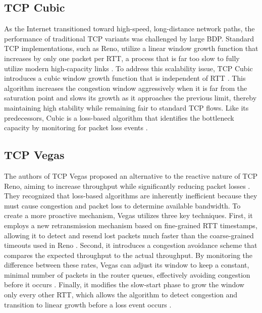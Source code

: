 \subsection{TCP Cubic}

As the Internet transitioned toward high-speed, long-distance network paths, the performance of traditional \ac{TCP} variants was challenged by large \ac{BDP}. 
Standard TCP implementations, such as Reno, utilize a linear window growth function that increases by only one packet per \ac{RTT}, a process that is far too slow to fully utilize modern high-capacity links \cite{TCPCUBIC}. 
To address this scalability issue, TCP Cubic introduces a cubic window growth function that is independent of \ac{RTT} \cite{TCPCUBIC}. 
This algorithm increases the congestion window aggressively when it is far from the saturation point and slows its growth as it approaches the previous limit, thereby maintaining high stability while remaining fair to standard TCP flows. 
Like its predecessors, Cubic is a loss-based algorithm that identifies the bottleneck capacity by monitoring for packet loss events \cite{TCPCUBIC}.

\subsection{TCP Vegas}

The authors of TCP Vegas proposed an alternative to the reactive nature of TCP Reno, aiming to increase throughput while significantly reducing packet losses \cite{TCPVEGAS}. 
They recognized that loss-based algorithms are inherently inefficient because they must cause congestion and packet loss to determine available bandwidth. 
To create a more proactive mechanism, Vegas utilizes three key techniques. 
First, it employs a new retransmission mechanism based on fine-grained \ac{RTT} timestamps, allowing it to detect and resend lost packets much faster than the coarse-grained timeouts used in Reno \cite{TCPVEGAS}. 
Second, it introduces a congestion avoidance scheme that compares the expected throughput to the actual throughput. 
By monitoring the difference between these rates, Vegas can adjust its window to keep a constant, minimal number of packets in the router queues, effectively avoiding congestion before it occurs \cite{TCPVEGAS}. 
Finally, it modifies the slow-start phase to grow the window only every other \ac{RTT}, which allows the algorithm to detect congestion and transition to linear growth before a loss event occurs \cite{TCPVEGAS}.

